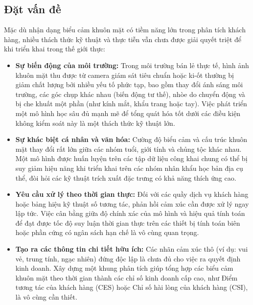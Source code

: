 \subsection{Đặt vấn đề}
Mặc dù nhận dạng biểu cảm khuôn mặt có tiềm năng lớn trong phân tích khách hàng, nhiều thách thức kỹ thuật và thực tiễn vẫn chưa được giải quyết triệt để khi triển khai trong thế giới thực:
\begin{itemize}
    \item \textbf{Sự biến động của môi trường:} Trong môi trường bán lẻ thực tế, hình ảnh khuôn mặt thu được từ camera giám sát tiêu chuẩn hoặc ki-ốt thường bị giảm chất lượng bởi nhiều yếu tố phức tạp, bao gồm thay đổi ánh sáng môi trường, các góc chụp khác nhau (biến động tư thế), nhòe do chuyển động và bị che khuất một phần (như kính mắt, khẩu trang hoặc tay). Việc phát triển một mô hình học sâu đủ mạnh mẽ để tổng quát hóa tốt dưới các điều kiện không kiểm soát này là một thách thức kỹ thuật lớn.
    \item \textbf{Sự khác biệt cá nhân và văn hóa:} Cường độ biểu cảm và cấu trúc khuôn mặt thay đổi rất lớn giữa các nhóm tuổi, giới tính và chủng tộc khác nhau. Một mô hình được huấn luyện trên các tập dữ liệu công khai chung có thể bị suy giảm hiệu năng khi triển khai trên các nhóm nhân khẩu học bản địa cụ thể, đòi hỏi các kỹ thuật trích xuất đặc trưng có khả năng thích ứng cao.
    \item \textbf{Yêu cầu xử lý theo thời gian thực:} Đối với các quầy dịch vụ khách hàng hoặc bảng hiệu kỹ thuật số tương tác, phản hồi cảm xúc cần được xử lý ngay lập tức. Việc cân bằng giữa độ chính xác của mô hình và hiệu quả tính toán để đạt được tốc độ suy luận thời gian thực trên các thiết bị tính toán biên hoặc phần cứng có ngân sách hạn chế là vô cùng quan trọng.
    \item \textbf{Tạo ra các thông tin chi tiết hữu ích:} Các nhãn cảm xúc thô (ví dụ: vui vẻ, trung tính, ngạc nhiên) đứng độc lập là chưa đủ cho việc ra quyết định kinh doanh. Xây dựng một khung phân tích giúp tổng hợp các biểu cảm khuôn mặt theo thời gian thành các chỉ số kinh doanh cấp cao, như Điểm tương tác của khách hàng (CES) hoặc Chỉ số hài lòng của khách hàng (CSI), là vô cùng cần thiết.
\end{itemize}

